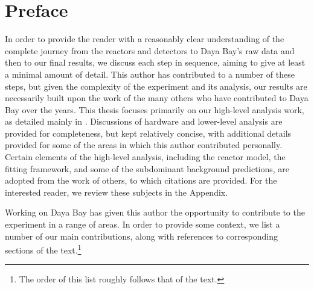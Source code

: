 \documentclass[../thesis.tex]{subfiles}
\begin{document}
\chapter*{Preface}

In order to provide the reader with a reasonably clear understanding of the complete journey from the reactors and detectors to Daya Bay's raw data and then to our final results, we discuss each step in sequence, aiming to give at least a minimal amount of detail. This author has contributed to a number of these steps, but given the complexity of the experiment and its analysis, our results are necessarily built upon the work of the many others who have contributed to Daya Bay over the years. This thesis focuses primarily on our high-level analysis work, as detailed mainly in . Discussions of hardware and lower-level analysis are provided for completeness, but kept relatively concise, with additional details provided for some of the areas in which this author contributed personally. Certain elements of the high-level analysis, including the reactor model, the fitting framework, and some of the subdominant background predictions, are adopted from the work of others, to which citations are provided. For the interested reader, we review these subjects in the Appendix.


Working on Daya Bay has given this author the opportunity to contribute to the experiment in a range of areas. In order to provide some context, we list a number of our main contributions, along with references to corresponding sections of the text.\footnote{The order of this list roughly follows that of the text.}
\end{document}
